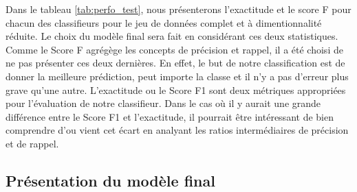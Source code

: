 Dans le tableau \ref{tab:perfo_test}, nous présenterons l'exactitude et le score F pour chacun des classifieurs pour le jeu de données complet et à dimentionnalité réduite. Le choix du modèle final sera fait en considérant ces deux statistiques. \\

Comme le Score F agrégège les concepts de précision et rappel, il a été choisi de ne pas présenter ces deux dernières. En effet, le but de notre classification est de donner la meilleure prédiction, peut importe la classe et il n'y a pas d'erreur plus grave qu'une autre. L'exactitude ou le Score F1 sont deux métriques appropriées pour l'évaluation de notre classifieur. Dans le cas où il y aurait une grande différence entre le Score F1 et l'exactitude, il pourrait être intéressant de bien comprendre d'ou vient cet écart en analyant les ratios intermédiaires de précision et de rappel.

\begin{table}[H]
	
	\caption{\label{tab:perfo_test}Performances des différents modèles sur le jeu de données de test selon les différentes mesures de performance.}
	\centering
\end{table}


\subsection{Présentation du modèle final}

